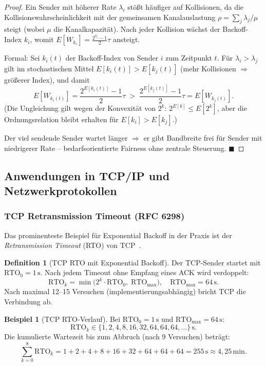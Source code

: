 ﻿\documentclass[a4paper,12pt]{article}
\theoremstyle{definition}
\newtheorem{definition}{Definition}
\newtheorem{beispiel}{Beispiel}
\begin{document}
\begin{proof}
Ein Sender mit höherer Rate $\lambda_i$ stößt häufiger auf Kollisionen,
da die Kollisionswahrscheinlichkeit mit der gemeinsamen Kanalauslastung
$\rho = \sum_j \lambda_j / \mu$ steigt (wobei $\mu$ die Kanalkapazität).
Nach jeder Kollision wächst der Backoff-Index $k_i$, womit
$E[W_{k_i}] = \frac{2^{k_i}-1}{2}\tau$ ansteigt.

Formal: Sei $k_i(t)$ der Backoff-Index von Sender $i$ zum Zeitpunkt $t$.
Für $\lambda_i > \lambda_j$ gilt im stochastischen Mittel
$E[k_i(t)] > E[k_j(t)]$ (mehr Kollisionen $\Rightarrow$ größerer Index),
und damit
\[
  E\!\left[W_{k_i(t)}\right] = \frac{2^{E[k_i(t)]}-1}{2}\tau
  \;>\;
  \frac{2^{E[k_j(t)]}-1}{2}\tau = E\!\left[W_{k_j(t)}\right].
\]
(Die Ungleichung gilt wegen der Konvexität von $2^k$:
$2^{E[k]} \leq E[2^k]$, aber die Ordnungsrelation bleibt erhalten
für $E[k_i] > E[k_j]$.)

Der viel sendende Sender wartet länger $\Rightarrow$ er gibt Bandbreite
frei für Sender mit niedrigerer Rate -- bedarfsorientierte Fairness
ohne zentrale Steuerung.
\hfill$\blacksquare$
\end{proof}

\subsection{Anwendungen in TCP/IP und Netzwerkprotokollen}

\subsubsection{TCP Retransmission Timeout (RFC 6298)}

Das prominenteste Beispiel für Exponential Backoff in der Praxis ist
der \emph{Retransmission Timeout} (RTO) von TCP~\cite{rfc6298}.

\begin{definition}[TCP RTO mit Exponential Backoff]
Der TCP-Sender startet mit $\mathrm{RTO}_0 = 1\,\mathrm{s}$.
Nach jedem Timeout ohne Empfang eines ACK wird verdoppelt:
\[
  \mathrm{RTO}_k = \min\bigl(2^k \cdot \mathrm{RTO}_0,\;
                              \mathrm{RTO}_{\max}\bigr),
  \quad \mathrm{RTO}_{\max} = 64\,\mathrm{s}.
\]
Nach maximal 12--15 Versuchen (implementierungsabhängig) bricht TCP
die Verbindung ab.
\end{definition}

\begin{beispiel}[TCP RTO-Verlauf]
Bei $\mathrm{RTO}_0 = 1\,\mathrm{s}$ und $\mathrm{RTO}_{\max} = 64\,\mathrm{s}$:
\[
  \mathrm{RTO}_k \in \{1, 2, 4, 8, 16, 32, 64, 64, 64, \ldots\}\,\mathrm{s}.
\]
Die kumulierte Wartezeit bis zum Abbruch (nach 9 Versuchen) beträgt:
\[
  \sum_{k=0}^{8} \mathrm{RTO}_k = 1+2+4+8+16+32+64+64+64 = 255\,\mathrm{s}
  \approx 4{,}25\,\mathrm{min}.
\]
\end{beispiel}
\end{document}
